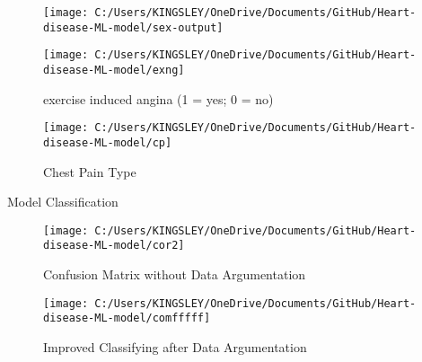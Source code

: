 \documentclass[11pt]{beamer}
\begin{document}
\begin{frame}
	\begin{figure}
		\centering
		\texttt{[image: C:/Users/KINGSLEY/OneDrive/Documents/GitHub/Heart-disease-ML-model/sex-output]}
		\caption{}
		\label{fig:sex-output}
	\end{figure}
	
\end{frame}


\begin{frame}
	\begin{figure}
		\centering
		\texttt{[image: C:/Users/KINGSLEY/OneDrive/Documents/GitHub/Heart-disease-ML-model/exng]}
		\caption{exercise induced angina (1 = yes; 0 = no)}
		\label{fig:exng}
	\end{figure}
	
\end{frame}

\begin{frame}
	\begin{figure}
		\centering
		\texttt{[image: C:/Users/KINGSLEY/OneDrive/Documents/GitHub/Heart-disease-ML-model/cp]}
		\caption{Chest Pain Type}
		\label{fig:cp}
	\end{figure}
	
\end{frame}

\begin{frame}{Model Classification}
\begin{figure}
	\centering
	\texttt{[image: C:/Users/KINGSLEY/OneDrive/Documents/GitHub/Heart-disease-ML-model/cor2]}
	\caption{Confusion Matrix without Data Argumentation }
	\label{fig:cor2}
\end{figure}

\end{frame}

\begin{frame}
	\begin{figure}
		\centering
		\texttt{[image: C:/Users/KINGSLEY/OneDrive/Documents/GitHub/Heart-disease-ML-model/comfffff]}
		\caption{Improved Classifying after Data Argumentation }
		\label{fig:comfffff}
	\end{figure}
	
\end{frame}
\end{document}
